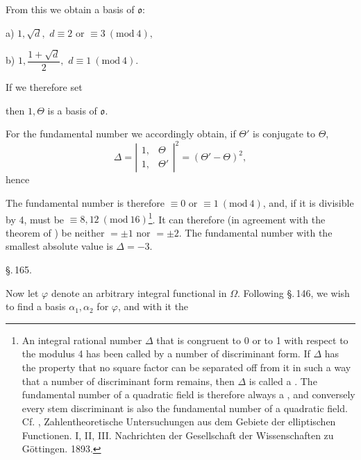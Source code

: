 From this we obtain a basis of $\mathfrak{o}$:

a) \quad $1, \sqrt{d},$ \hfill $d\equiv 2$ or $\equiv 3\ (\mathrm{mod}\ 4),$

b) \quad $1, \dfrac{1+\sqrt{d}}{2},$ \hfill $d\equiv 1\ (\mathrm{mod}\ 4).$

If we therefore set

then $1, \Theta$ is a basis of $\mathfrak{o}$.

For the fundamental number we accordingly obtain, if $\Theta'$ is conjugate to $\Theta$,
\[ \Delta = \left|\begin{array}{cc} 1, & \Theta \\ 1, & \Theta' \end{array}\right|^2 = (\Theta'-\Theta)^2, \]
hence


The fundamental number is therefore $\equiv 0$ or $\equiv 1\ (\mathrm{mod}\ 4)$, and, if it is divisible by 4, must be $\equiv 8, 12\ (\mathrm{mod}\ 16)$\footnote{An integral rational number $\Delta$ that is congruent to 0 or to 1 with respect to the modulus 4 has been called by  a number of discriminant form. If $\Delta$ has the property that no square factor can be separated off from it in such a way that a number of discriminant form remains, then $\Delta$ is called a . The fundamental number of a quadratic field is therefore always a , and conversely every stem discriminant is also the fundamental number of a quadratic field. Cf. , Zahlentheoretische Untersuchungen aus dem Gebiete der elliptischen Functionen. I, II, III. Nachrichten der Gesellschaft der Wissenschaften zu G\"ottingen. 1893.}. It can therefore (in agreement with the theorem of ) be neither $=\pm 1$ nor $=\pm 2$. The fundamental number with the smallest absolute value is $\Delta = -3.$

\begin{center}
\S.\,165.\\
\end{center}

Now let $\varphi$ denote an arbitrary integral functional in $\Omega$. Following \S.\,146, we wish to find a basis $\alpha_1, \alpha_2$ for $\varphi$, and with it the
